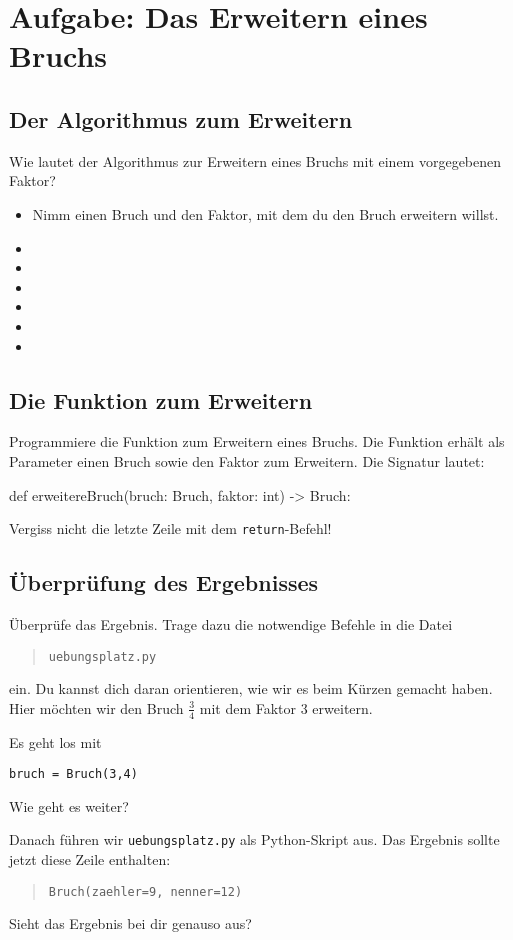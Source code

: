 \section{Aufgabe: Das Erweitern eines Bruchs}

\subsection*{Der Algorithmus zum Erweitern}

Wie lautet der Algorithmus zur Erweitern eines Bruchs mit einem vorgegebenen Faktor?


\begin{itemize}[itemsep=5ex]
	\item Nimm einen Bruch und den Faktor, mit dem du den Bruch erweitern willst.
	\item  
	\item  
	\item  
	\item 
	\item  
	\item
\end{itemize}

\pagebreak

\subsection*{Die Funktion zum Erweitern}

Programmiere die Funktion zum Erweitern eines Bruchs. Die Funktion erhält als Parameter einen Bruch sowie den Faktor zum Erweitern. Die Signatur lautet:

\begin{codePython}
def erweitereBruch(bruch: Bruch, faktor: int) -> Bruch:
\end{codePython}

Vergiss nicht die letzte Zeile mit dem \texttt{return}-Befehl!

\subsection*{Überprüfung des Ergebnisses}

Überprüfe das Ergebnis. Trage dazu die notwendige Befehle in die Datei
\begin{quote}
	\texttt{uebungsplatz.py}
\end{quote}
ein. Du kannst dich daran orientieren, wie wir es beim Kürzen gemacht haben. Hier möchten wir den Bruch $\frac{3}{4}$ mit dem Faktor 3 erweitern.

Es geht los mit

\lstset{style=syntaxPython}
\begin{lstlisting}
bruch = Bruch(3,4)
\end{lstlisting}

Wie geht es weiter?

Danach führen wir \texttt{uebungsplatz.py} als Python-Skript aus. Das Ergebnis sollte jetzt diese Zeile enthalten:
\begin{quote}
\texttt{Bruch(zaehler=9, nenner=12)}
\end{quote}

Sieht das Ergebnis bei dir genauso aus?

